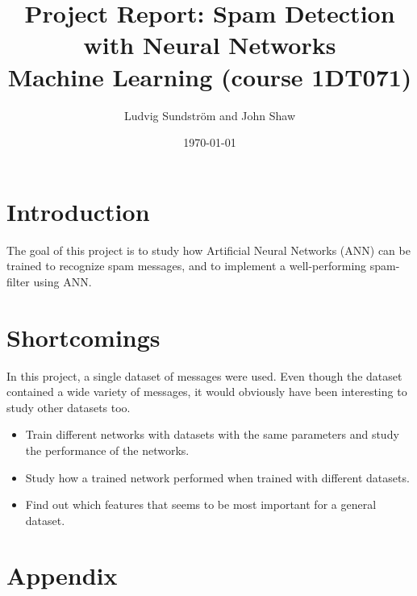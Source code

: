 \documentclass[a4paper,11pt]{article}
\title{\textbf{Project Report: Spam Detection with Neural Networks} \\
    \textbf{Machine Learning (course 1DT071)} \\  
}
\author{Ludvig Sundstr\"{o}m and John Shaw}
\date{\today}
\theoremstyle{definition}
\begin{document}
\maketitle
\newpage
\tableofcontents
\newpage

\section{Introduction} 
  The goal of this project is to study how Artificial Neural Networks (ANN) can
  be trained to recognize spam messages, and to implement a well-performing
  spam-filter using ANN.







\section{Shortcomings}
  In this project, a single dataset of messages were used. Even though the
  dataset contained a wide variety of messages, it would obviously have been
  interesting to study other datasets too.   
  \begin{itemize} 
    \item Train different networks with datasets with the same parameters and
      study the performance of the networks.
    \item Study how a trained network performed when trained with different
    datasets.  
    \item Find out which features that seems to be most important
      for a general dataset. 
  \end{itemize} 

\section{Appendix}
\end{document}
